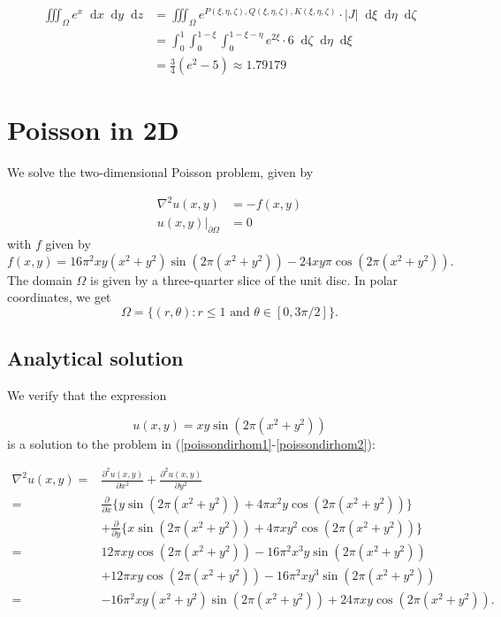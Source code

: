 \documentclass{report}
\renewcommand*\d{\mathop{}\!\mathrm{d}}
\begin{document}
\begin{align}
	\iiint_\Omega e^x \d x \d y \d z &= \iiint_\Omega e^{P(\xi,\eta,\zeta), Q(\xi,\eta,\zeta), K(\xi, \eta,\zeta)} \cdot |J| \d\xi \d\eta \d\zeta \\   
	&= \int_0^1 \int_0^{1-\xi} \int_0^{1-\xi-\eta} e^{2\xi} \cdot 6 \d\zeta \d\eta \d\xi \\
	&= \frac{3}{4}(e^2 - 5) \approx 1.79179
\end{align}


\section{Poisson in 2D}

We solve the two-dimensional Poisson problem, given by

\begin{align}
	\nabla^2 u(x,y) &= -f(x,y) \label{poissondirhom1} \\
	u(x,y)|_{\partial\Omega} &= 0 \label{poissondirhom2}
\end{align}
with $f$ given by
\begin{equation}
	f(x,y)=16\pi^2 xy(x^2 + y^2) \sin (2\pi (x^2 + y^2))-24xy\pi \cos (2\pi (x^2 + y^2)).
\end{equation}
The domain $\Omega$ is given by a three-quarter slice of the unit disc. In polar coordinates, we get
\begin{equation}
	\Omega = \{(r,\theta): r\le1 \text{ and } \theta \in [0,3\pi/2]\}.
\end{equation}

\subsection{Analytical solution}

We verify that the expression

\begin{equation} \label{poissonsol}
	u(x,y)=xy \sin (2\pi (x^2 + y^2))
\end{equation}
is a solution to the problem in (\ref{poissondirhom1}-\ref{poissondirhom2}):

\begin{align}
	\nabla^2 u(x,y) =& \frac{\partial^2 u(x,y)}{\partial x^2} + \frac{\partial^2 u(x,y)}{\partial y^2} \\
	=& \frac{\partial}{\partial x}\{y \sin (2\pi (x^2 + y^2)) +4\pi x^2 y \cos (2\pi (x^2 + y^2))\} \\
	& + \frac{\partial}{\partial y}\{x \sin (2\pi (x^2 + y^2)) +4\pi x y^2 \cos (2\pi (x^2 + y^2))\} \\
	=& 12\pi xy \cos (2\pi (x^2 + y^2)) - 16\pi^2 x^3 y\sin (2\pi (x^2 + y^2)) \\
	& + 12\pi xy \cos (2\pi (x^2 + y^2)) - 16\pi^2 x y^3 \sin (2\pi (x^2 + y^2)) \\
	=& -16\pi^2 xy (x^2 + y^2) \sin (2\pi (x^2 + y^2)) + 24\pi xy \cos (2\pi (x^2 + y^2)).
\end{align}
\end{document}
